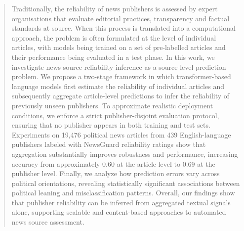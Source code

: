 \documentclass[journal]{IEEEtran}
\begin{document}
\begin{abstract}
Traditionally, the reliability of news publishers is assessed by expert organisations that evaluate editorial practices, transparency and factual standards at source. When this process is translated into a computational approach, the problem is often formulated at the level of individual articles, with models being trained on a set of pre-labelled articles and their performance being evaluated in a test phase. %
In this work, we investigate news source reliability inference as a source-level prediction problem. We propose a two-stage framework in which transformer-based language models first estimate the reliability of individual articles and subsequently aggregate article-level predictions to infer the reliability of previously unseen publishers.
To approximate realistic deployment conditions, we enforce a strict publisher-disjoint evaluation protocol, ensuring that no publisher appears in both training and test sets.
Experiments on 19,476 political news articles from 439 English-language publishers labeled with NewsGuard reliability ratings show that aggregation substantially improves robustness and performance, increasing accuracy from approximately 0.60 at the article level to 0.69 at the publisher level.
Finally, we analyze how prediction errors vary across political orientations, revealing statistically significant associations between political leaning and misclassification patterns.
Overall, our findings show that publisher reliability can be inferred from aggregated textual signals alone, supporting scalable and content-based approaches to automated news source assessment.


\end{abstract}
\end{document}
